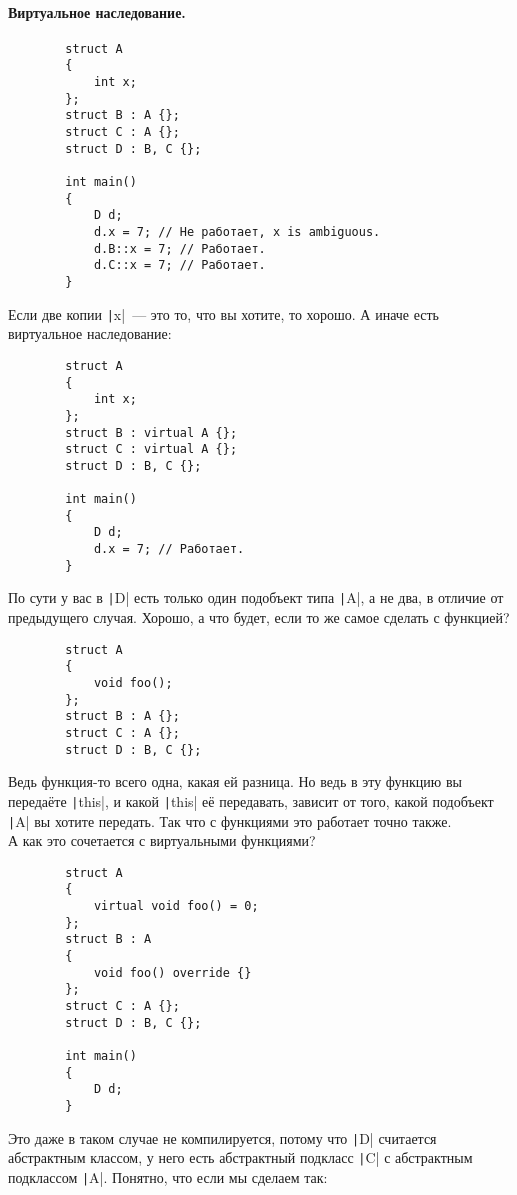 \documentclass{article}
\begin{document}
    \paragraph{Виртуальное наследование.}
    \begin{verbatim}
        struct A
        {
            int x;
        };
        struct B : A {};
        struct C : A {};
        struct D : B, C {};

        int main()
        {
            D d;
            d.x = 7; // Не работает, x is ambiguous.
            d.B::x = 7; // Работает.
            d.C::x = 7; // Работает.
        }
    \end{verbatim}
    Если две копии \texttt|x|~--- это то, что вы хотите, то хорошо. А иначе есть виртуальное наследование:
    \begin{verbatim}
        struct A
        {
            int x;
        };
        struct B : virtual A {};
        struct C : virtual A {};
        struct D : B, C {};
        
        int main()
        {
            D d;
            d.x = 7; // Работает.
        }
    \end{verbatim}
    По сути у вас в \texttt|D| есть только один подобъект типа \texttt|A|, а не два, в отличие от предыдущего случая. Хорошо, а что будет, если то же самое сделать с функцией?
    \begin{verbatim}
        struct A
        {
            void foo();
        };
        struct B : A {};
        struct C : A {};
        struct D : B, C {};
    \end{verbatim}
    Ведь функция-то всего одна, какая ей разница. Но ведь в эту функцию вы передаёте \texttt|this|, и какой \texttt|this| её передавать, зависит от того, какой подобъект \texttt|A| вы хотите передать. Так что с функциями это работает точно также.\\
    А как это сочетается с виртуальными функциями?
    \begin{verbatim}
        struct A
        {
            virtual void foo() = 0;
        };
        struct B : A
        {
            void foo() override {}
        };
        struct C : A {};
        struct D : B, C {};
        
        int main()
        {
            D d;
        }
    \end{verbatim}
    Это даже в таком случае не компилируется, потому что \texttt|D| считается абстрактным классом, у него есть абстрактный подкласс \texttt|C| с абстрактным подклассом \texttt|A|. Понятно, что если мы сделаем так:
\end{document}
